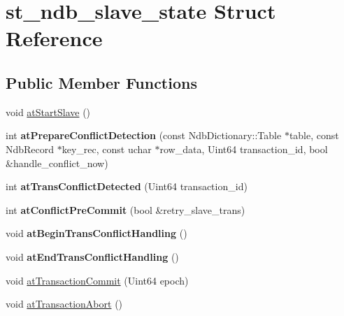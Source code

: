 \hypertarget{structst__ndb__slave__state}{}\section{st\+\_\+ndb\+\_\+slave\+\_\+state Struct Reference}
\label{structst__ndb__slave__state}
\subsection*{Public Member Functions}
\begin{DoxyCompactItemize}
\item 
void \mbox{\hyperlink{structst__ndb__slave__state_a48c3936791f966c865d2c28a0b305012}{at\+Start\+Slave}} ()
\item 
\mbox{\label{structst__ndb__slave__state_ac6062f52659babcb3176a9bcc94618fa}} 
int {\bfseries at\+Prepare\+Conflict\+Detection} (const Ndb\+Dictionary\+::\+Table $\ast$table, const Ndb\+Record $\ast$key\+\_\+rec, const uchar $\ast$row\+\_\+data, Uint64 transaction\+\_\+id, bool \&handle\+\_\+conflict\+\_\+now)
\item 
\mbox{\label{structst__ndb__slave__state_ad47592803b485c0e1e7be59d91b9b493}} 
int {\bfseries at\+Trans\+Conflict\+Detected} (Uint64 transaction\+\_\+id)
\item 
\mbox{\label{structst__ndb__slave__state_ab98cd46fd49f5b5ecd7fb61228b42a3a}} 
int {\bfseries at\+Conflict\+Pre\+Commit} (bool \&retry\+\_\+slave\+\_\+trans)
\item 
\mbox{\label{structst__ndb__slave__state_aebeace200b414036bb20c75fa306f8b0}} 
void {\bfseries at\+Begin\+Trans\+Conflict\+Handling} ()
\item 
\mbox{\label{structst__ndb__slave__state_ac7bafed724ff1ddf544108ba638a788e}} 
void {\bfseries at\+End\+Trans\+Conflict\+Handling} ()
\item 
void \mbox{\hyperlink{structst__ndb__slave__state_a3d731f8bfdce1ea3802fcb0cb3a27d73}{at\+Transaction\+Commit}} (Uint64 epoch)
\item 
void \mbox{\hyperlink{structst__ndb__slave__state_a919ec93137f0ebaae6e29118882dd141}{at\+Transaction\+Abort}} ()

\end{DoxyCompactItemize}
